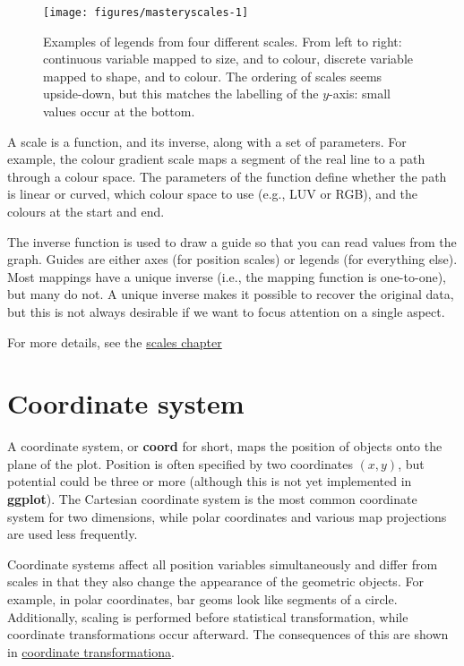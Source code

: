 \begin{figure}

{\centering \texttt{[image: figures/masteryscales-1]} 

}

\caption{Examples of legends from four different scales. From left to right: continuous variable mapped to size, and to colour, discrete variable mapped to shape, and to colour. The ordering of scales seems upside-down, but this matches the labelling of the $y$-axis: small values occur at the bottom.\label{fig:scales}}
\end{figure}

A scale is a function, and its inverse, along with a set of parameters.
For example, the colour gradient scale maps a segment of the real line
to a path through a colour space. The parameters of the function define
whether the path is linear or curved, which colour space to use (e.g.,
LUV or RGB), and the colours at the start and end.

The inverse function is used to draw a guide so that you can read values
from the graph. Guides are either axes (for position scales) or legends
(for everything else). Most mappings have a unique inverse (i.e., the
mapping function is one-to-one), but many do not. A unique inverse makes
it possible to recover the original data, but this is not always
desirable if we want to focus attention on a single aspect.

For more details, see the \hyperref[cha:scales]{scales chapter}

\section{Coordinate system}\label{sec:coordinate-systems}

A coordinate system, or \textbf{coord} for short, maps the position of
objects onto the plane of the plot. Position is often specified by two
coordinates \((x, y)\), but potential could be three or more (although
this is not yet implemented in \textbf{ggplot}). The Cartesian
coordinate system is the most common coordinate system for two
dimensions, while polar coordinates and various map projections are used
less frequently. 

Coordinate systems affect all position variables simultaneously and
differ from scales in that they also change the appearance of the
geometric objects. For example, in polar coordinates, bar geoms look
like segments of a circle. Additionally, scaling is performed before
statistical transformation, while coordinate transformations occur
afterward. The consequences of this are shown in
\hyperref[sub:coord-transformation]{coordinate transformationa}.

